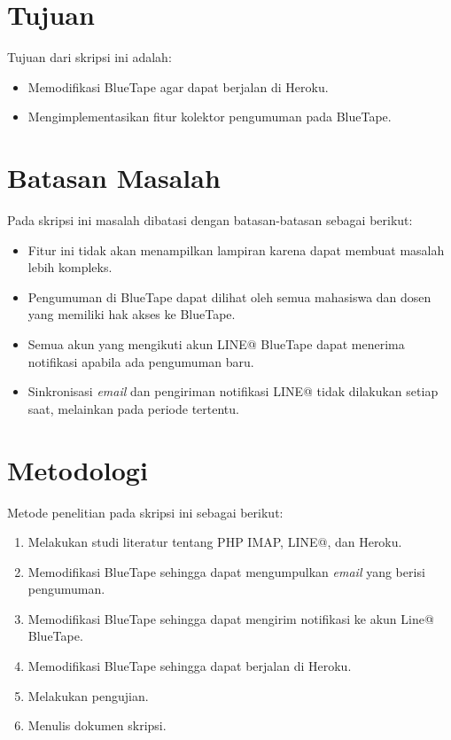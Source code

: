 \section{Tujuan}
\label{sec:tujuan}
Tujuan dari skripsi ini adalah:
\begin{itemize}
	\item Memodifikasi BlueTape agar dapat berjalan di Heroku.
	\item Mengimplementasikan fitur kolektor pengumuman pada BlueTape.
\end{itemize}

\section{Batasan Masalah}
\label{sec:batasan}
Pada skripsi ini masalah dibatasi dengan batasan-batasan sebagai berikut:
\begin{itemize}
	\item Fitur ini tidak akan menampilkan lampiran karena dapat membuat masalah lebih kompleks.
	\item Pengumuman di BlueTape dapat dilihat oleh semua mahasiswa dan dosen yang memiliki hak akses ke BlueTape.
	\item Semua akun yang mengikuti akun LINE@ BlueTape dapat menerima notifikasi apabila ada pengumuman baru.
	\item Sinkronisasi \textit{email} dan pengiriman notifikasi LINE@ tidak dilakukan setiap saat, melainkan pada periode tertentu.
\end{itemize}

\section{Metodologi}
\label{sec:metodepenelitian}
Metode penelitian pada skripsi ini sebagai berikut:
	\begin{enumerate}
		\item Melakukan studi literatur tentang PHP IMAP, LINE@, dan Heroku.
		\item Memodifikasi BlueTape sehingga dapat mengumpulkan \textit{email} yang berisi pengumuman.
		\item Memodifikasi BlueTape sehingga dapat mengirim notifikasi ke akun Line@ BlueTape.
		\item Memodifikasi BlueTape sehingga dapat berjalan di Heroku.
		\item Melakukan pengujian.
		\item Menulis dokumen skripsi.
	\end{enumerate}

